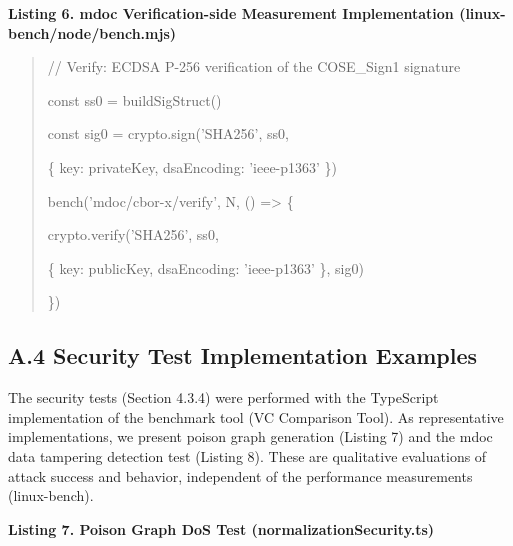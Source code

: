 \documentclass[conference]{IEEEtran}
\begin{document}
\textbf{Listing 6. mdoc Verification-side Measurement Implementation (linux-bench/node/bench.mjs)}

\begin{quote}
// Verify: ECDSA P-256 verification of the COSE\_Sign1 signature

const ss0 = buildSigStruct()

const sig0 = crypto.sign('SHA256', ss0,

\{ key: privateKey, dsaEncoding: 'ieee-p1363' \})

bench('mdoc/cbor-x/verify', N, () =\textgreater{} \{

crypto.verify('SHA256', ss0,

\{ key: publicKey, dsaEncoding: 'ieee-p1363' \}, sig0)

\})
\end{quote}

\subsection*{A.4 Security Test Implementation Examples}

The security tests (Section 4.3.4) were performed with the TypeScript implementation of the benchmark tool (VC Comparison Tool). As representative implementations, we present poison graph generation (Listing 7) and the mdoc data tampering detection test (Listing 8). These are qualitative evaluations of attack success and behavior, independent of the performance measurements (linux-bench).

\textbf{Listing 7. Poison Graph DoS Test (normalizationSecurity.ts)}
\end{document}
